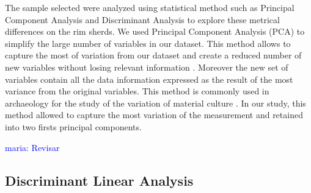 \documentclass[review]{elsarticle}
\newcommand{\memo}[2]{\textcolor{#1}{#2}}
\newcommand{\maria}[1]{\memo{blue}{maria: #1\\}}
\begin{document}
The sample selected were analyzed using statistical method such as Principal Component Analysis and Discriminant Analysis to explore these metrical differences on the rim sherds.
We used Principal Component Analysis (PCA) to simplify the large number of variables in our dataset. This method allows to capture the most of variation from our dataset and create a reduced number of new variables without losing relevant information \citep{jolliffe_principal_2002, shennan_quantifying_1997}. Moreover the new set of variables contain all the data information expressed as the result of the most variance from the original variables. This method is commonly used in archaeology for the study of the variation of material culture \citep{li_crossbows_2014, schillinger_differences_2016}. In our study, this method allowed to capture the most variation of the measurement and retained into two firsts principal components. 


\maria{Revisar}

\subsection{Discriminant Linear Analysis} 
\end{document}
